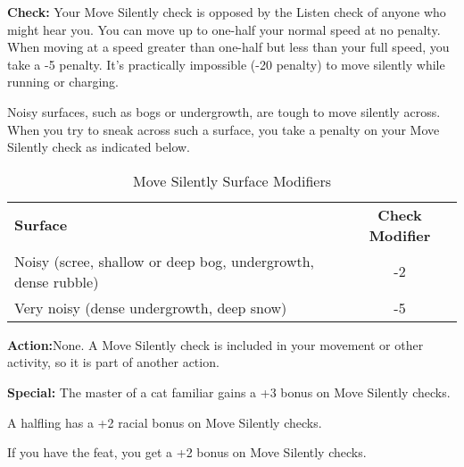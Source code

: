
\textbf{Check:} Your Move Silently check is opposed by the Listen check of anyone 
who might hear you. You can move up to one-half your normal speed at no penalty. 
When moving at a speed greater than one-half but less than your full speed, you 
take a -5 penalty. It's practically impossible (-20 penalty) to move silently while 
running or charging.

Noisy surfaces, such as bogs or undergrowth, are tough to move silently across. 
When you try to sneak across such a surface, you take a penalty on your Move Silently 
check as indicated below.

\begin{table}[htb]
\caption{Move Silently Surface Modifiers}
\centering
\begin{tabular}{lc}
\textbf{Surface} & \textbf{Check Modifier}\\
Noisy (scree, shallow or deep bog, undergrowth, dense rubble) & -2 \\
Very noisy (dense undergrowth, deep snow) & -5 \\
\end{tabular}
\end{table}

\textbf{Action:}None. A Move Silently check is included in your movement or other 
activity, so it is part of another action.

\textbf{Special:} The master of a cat familiar gains a +3 bonus on Move Silently 
checks.

A halfling has a +2 racial bonus on Move Silently checks.

If you have the  feat, you get a +2 bonus on Move Silently checks.
